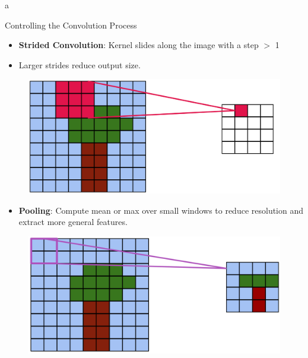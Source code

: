 a\documentclass[10pt]{beamer}
\theoremstyle{remark}
\theoremstyle{definition}
\begin{document}
\begin{frame}[allowframebreaks]{Controlling the Convolution Process}
\framebreak

\begin{itemize}
    \item \textbf{Strided Convolution}: Kernel slides along the image with a step $>$ 1
    \item Larger strides reduce output size.
\end{itemize}


\begin{figure}
\centering
\includegraphics[width=1.0\textwidth,height=0.8\textheight,keepaspectratio]{./images/stride_2.png}
\end{figure}
    
\framebreak

\begin{itemize}
    \item \textbf{Pooling}: Compute mean or max over small windows to reduce resolution and extract more general features.
\end{itemize}


\begin{figure}
\centering
\includegraphics[width=1.0\textwidth,height=0.8\textheight,keepaspectratio]{./images/pool_1.png}
\end{figure}

\framebreak


\end{frame}
\end{document}
